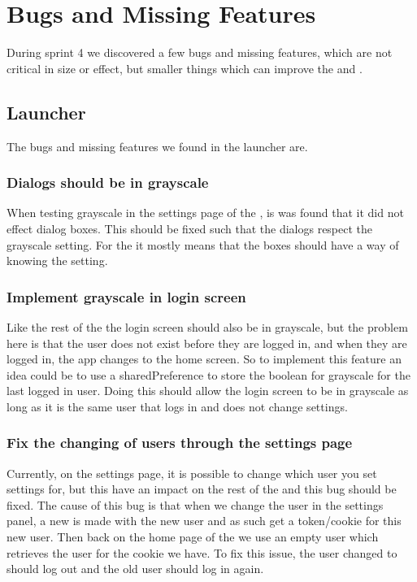 \section{Bugs and Missing Features}
During sprint 4 we discovered a few bugs and missing features, which are not
critical in size or effect, but smaller things which can improve the
 and .

\subsection{Launcher}
The bugs and missing features we found in the launcher are.

\subsubsection{Dialogs should be in grayscale}
When testing grayscale in the settings page of the , is was
found that it did not effect dialog boxes. This should be fixed such that the
dialogs respect the grayscale setting. For the  it mostly means
that the boxes should have a way of knowing the setting.

\subsubsection{Implement grayscale in login screen}
Like the rest of the  the login screen should also be in
grayscale, but the problem here is that the user does not exist before they are
logged in, and when they are logged in, the app changes to the home screen. So
to implement this feature an idea could be to use a sharedPreference to store
the boolean for grayscale for the last logged in user. Doing this should allow
the login screen to be in grayscale as long as it is the same user that logs
in and does not change settings.

\subsubsection{Fix the changing of users through the settings page}
Currently, on the settings page, it is possible to change which user you set
settings for, but this have an impact on the rest of the  and
this bug should be fixed. The cause of this bug is that when we change the user in
the settings panel, a new  is made with the new user and as
such get a token/cookie for this new user. Then back on the home page of the
 we use an empty user  which retrieves the user
for the cookie we have. To fix this issue, the user changed to should log out
and the old user should log in again.

